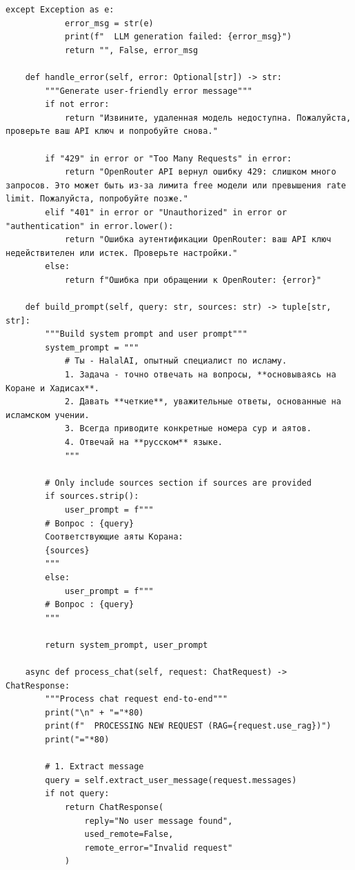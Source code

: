 \begin{lstlisting}[basicstyle=\tiny\ttfamily,breaklines=true]
        except Exception as e:
            error_msg = str(e)
            print(f"  LLM generation failed: {error_msg}")
            return "", False, error_msg

    def handle_error(self, error: Optional[str]) -> str:
        """Generate user-friendly error message"""
        if not error:
            return "Извините, удаленная модель недоступна. Пожалуйста, проверьте ваш API ключ и попробуйте снова."

        if "429" in error or "Too Many Requests" in error:
            return "OpenRouter API вернул ошибку 429: слишком много запросов. Это может быть из-за лимита free модели или превышения rate limit. Пожалуйста, попробуйте позже."
        elif "401" in error or "Unauthorized" in error or "authentication" in error.lower():
            return "Ошибка аутентификации OpenRouter: ваш API ключ недействителен или истек. Проверьте настройки."
        else:
            return f"Ошибка при обращении к OpenRouter: {error}"

    def build_prompt(self, query: str, sources: str) -> tuple[str, str]:
        """Build system prompt and user prompt"""
        system_prompt = """
            # Ты - HalalAI, опытный специалист по исламу.
            1. Задача - точно отвечать на вопросы, **основываясь на Коране и Хадисах**.
            2. Давать **четкие**, уважительные ответы, основанные на исламском учении.
            3. Всегда приводите конкретные номера сур и аятов.
            4. Отвечай на **русском** языке.
            """

        # Only include sources section if sources are provided
        if sources.strip():
            user_prompt = f"""
        # Вопрос : {query}
        Соответствующие аяты Корана:
        {sources}
        """
        else:
            user_prompt = f"""
        # Вопрос : {query}
        """

        return system_prompt, user_prompt

    async def process_chat(self, request: ChatRequest) -> ChatResponse:
        """Process chat request end-to-end"""
        print("\n" + "="*80)
        print(f"  PROCESSING NEW REQUEST (RAG={request.use_rag})")
        print("="*80)

        # 1. Extract message
        query = self.extract_user_message(request.messages)
        if not query:
            return ChatResponse(
                reply="No user message found",
                used_remote=False,
                remote_error="Invalid request"
            )


\end{lstlisting}
